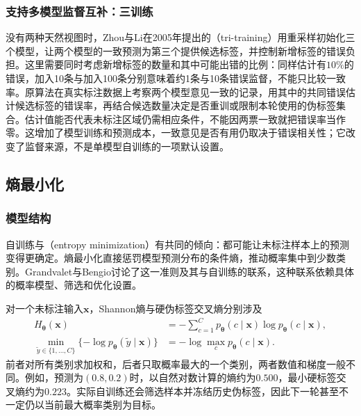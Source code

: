 \subsubsection{支持多模型监督互补：三训练}
\label{sec:classification-tri-training}

没有两种天然视图时，Zhou与Li在2005年提出的（tri-training）用重采样初始化三个模型，让两个模型的一致预测为第三个提供候选标签，并控制新增标签的错误负担。这里需要同时考虑新增标签的数量和其中可能出错的比例：同样估计有$10\%$的错误，加入10条与加入100条分别意味着约1条与10条错误监督，不能只比较一致率。原算法在真实标注数据上考察两个模型意见一致的记录，用其中的共同错误估计候选标签的错误率，再结合候选数量决定是否重训或限制本轮使用的伪标签集合。估计值能否代表未标注区域仍需相应条件，不能因两票一致就把错误率当作零。这增加了模型训练和预测成本，一致意见是否有用仍取决于错误相关性；它改变了监督来源，不是单模型自训练的一项默认设置。

\subsection{熵最小化}
\label{sec:classification-entropy-min}

\subsubsection{模型结构}
自训练与（entropy minimization）有共同的倾向：都可能让未标注样本上的预测变得更确定。熵最小化直接惩罚模型预测分布的条件熵，推动概率集中到少数类别。Grandvalet与Bengio讨论了这一准则及其与自训练的联系，这种联系依赖具体的概率模型、筛选和优化设置。

对一个未标注输入$\bm{x}$，Shannon熵与硬伪标签交叉熵分别涉及
\begin{equation}
  \label{eq:classification-pseudolabel-entropy}
  \begin{aligned}
    H_{\bm{\theta}}(\bm{x})
      &=-\sum_{c=1}^{C}p_{\bm{\theta}}(c\mid\bm{x})
        \log p_{\bm{\theta}}(c\mid\bm{x}),\\
    \min_{\widetilde y\in\{1,\dots,C\}}
      \{-\log p_{\bm{\theta}}(\widetilde y\mid\bm{x})\}
      &=-\log\max_c p_{\bm{\theta}}(c\mid\bm{x}).
  \end{aligned}
\end{equation}
前者对所有类别求加权和，后者只取概率最大的一个类别，两者数值和梯度一般不同。例如，预测为$(0.8,0.2)$时，以自然对数计算的熵约为$0.500$，最小硬标签交叉熵约为$0.223$。实际自训练还会筛选样本并冻结历史伪标签，因此下一轮甚至不一定仍以当前最大概率类别为目标。


